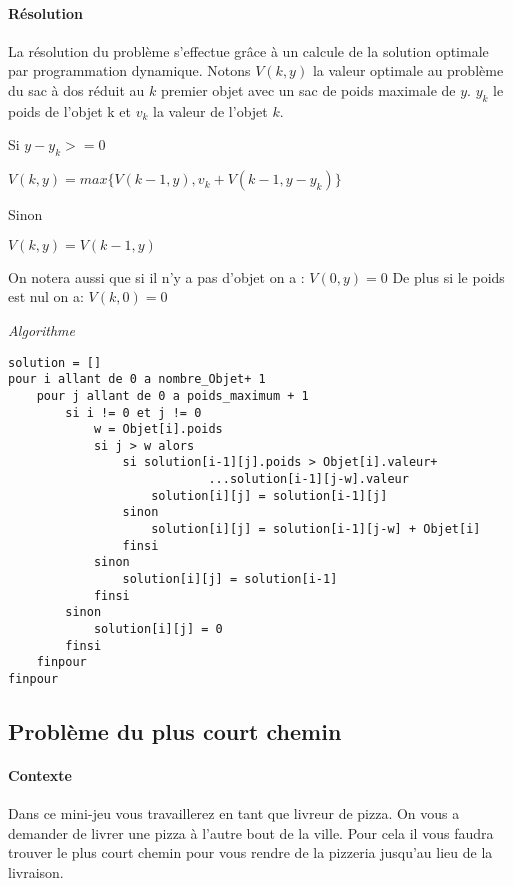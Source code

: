         \paragraph{Résolution}
            La résolution du problème s'effectue grâce à un calcule de la solution optimale
            par programmation dynamique. Notons $V(k,y)$ la valeur optimale au problème du sac à dos
            réduit au $k$ premier objet avec un sac de poids maximale de $y$.
            $y_{k}$ le poids de l'objet k et $v_{k}$ la valeur de l'objet $k$.

            Si $ y - y_{k} >= 0 $

                $V(k,y) = max\{ V(k-1,y)  ,v_{k} + V(k-1,y-y_{k}) \}$

            Sinon

                $V(k,y) = V(k-1,y)$

            On notera aussi que si il n'y a pas d'objet on a : $V(0,y) = 0$
            De plus si le poids est nul on a: $V(k,0) = 0$

	\emph{Algorithme}

\begin{lstlisting}
solution = []
pour i allant de 0 a nombre_Objet+ 1
    pour j allant de 0 a poids_maximum + 1
        si i != 0 et j != 0
            w = Objet[i].poids
            si j > w alors
                si solution[i-1][j].poids > Objet[i].valeur+
                            ...solution[i-1][j-w].valeur
                    solution[i][j] = solution[i-1][j]
                sinon
                    solution[i][j] = solution[i-1][j-w] + Objet[i]
                finsi
            sinon
                solution[i][j] = solution[i-1]
            finsi
        sinon
            solution[i][j] = 0
        finsi
    finpour
finpour
\end{lstlisting}


\subsection{Problème du plus court chemin}

        \paragraph{Contexte}
	    Dans ce mini-jeu vous travaillerez en tant que livreur de pizza. On vous a demander de 			livrer  une pizza à l'autre bout de la ville. Pour cela il vous faudra trouver le plus court chemin
	    pour vous rendre de la pizzeria jusqu'au lieu de la livraison.
